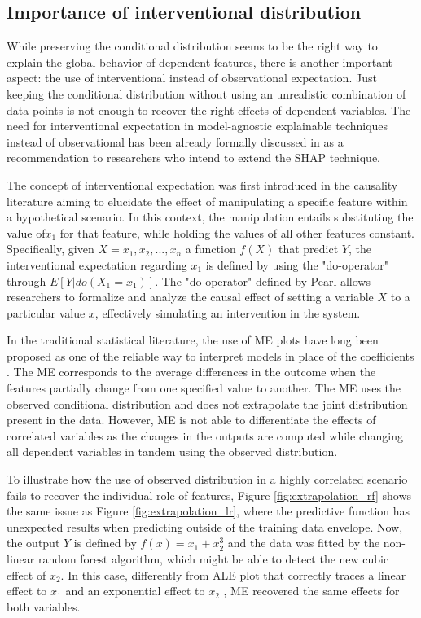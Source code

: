 
\subsection{Importance of interventional distribution}
\label{intervention}

While preserving the conditional distribution seems to be the right way to explain the global behavior of dependent features, there is another important aspect: the use of interventional instead of observational expectation. Just keeping the conditional distribution without using an unrealistic combination of data points is not enough to recover the right effects of dependent variables. The need for interventional expectation in model-agnostic explainable techniques instead of observational has been already formally discussed in \cite{Janzing2020FeatureProblem} as a recommendation to researchers who intend to extend the \gls{SHAP} technique. 

The concept of interventional expectation was first introduced in the causality literature \cite{Pearl1993BayesianIntervention} aiming to elucidate the effect of manipulating a specific feature within a hypothetical scenario. In this context, the manipulation entails substituting the value of$x_1$ for that feature, while holding the values of all other features constant. Specifically, given $X={x_1, x_2,...,x_n}$ a function $f(X)$ that predict $Y$, the interventional expectation regarding $x_1$ is defined by using the "do-operator" through \(E[Y | do(X_{1} = x_{1})]\). The "do-operator" defined by Pearl allows researchers to formalize and analyze the causal effect of setting a variable \(X\) to a particular value \(x\), effectively simulating an intervention in the system.  

In the traditional statistical literature, the use of \gls{ME} plots have long been proposed as one of the reliable way to interpret models in place of the coefficients \cite{long1997regression}. The \gls{ME} corresponds to the average differences in the outcome when the features partially change from one speciﬁed value to another. The \gls{ME} uses the observed conditional distribution and does not extrapolate the joint distribution present in the data. However, \gls{ME} is not able to differentiate the effects of correlated variables as the changes in the outputs are computed while changing all dependent variables in tandem using the observed distribution.

To illustrate how the use of observed distribution in a highly correlated scenario fails to recover the individual role of features, Figure \ref{fig:extrapolation_rf} shows the same issue as Figure \ref{fig:extrapolation_lr}, where the predictive function has unexpected results when predicting outside of the training data envelope. Now, the output $Y$ is defined by $f(x) = x_1 + x_2^3$ and the data was fitted by the non-linear random forest algorithm, which might be able to detect the new cubic effect of $x_2$. In this case, differently from \gls{ALE} plot that correctly traces a linear effect to $x_1$ and an exponential effect to $x_2$ , \gls{ME} recovered the same effects for both variables. 

